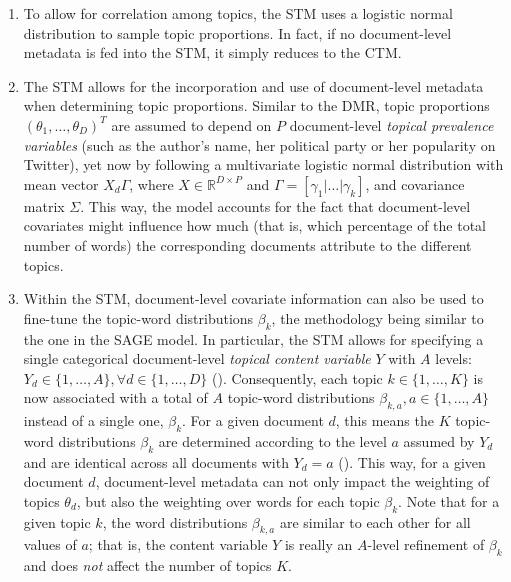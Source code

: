 \begin{enumerate}[label=(\roman*)]
\vspace{-0.25cm}
\item To allow for correlation among topics, the STM uses a logistic normal distribution to sample topic proportions. In fact, if no document-level metadata is fed into the STM, it simply reduces to the CTM.
\vspace{-0.25cm}
\item The STM allows for the incorporation and use of document-level metadata when determining topic proportions. Similar to the DMR, topic proportions $(\theta_1,\dots,\theta_D)^T$ are assumed to depend on $P$ document-level \textit{topical prevalence variables} (such as the author's name, her political party or her popularity on Twitter), yet now by following a multivariate logistic normal distribution with mean vector $X_d\Gamma$, where $X \in \mathbb{R}^{D \times P}$ and $\Gamma = [\gamma_1|\dots|\gamma_k]$, and covariance matrix $\Sigma$. This way, the model accounts for the fact that document-level covariates might influence how much (that is, which percentage of the total number of words) the corresponding documents attribute to the different topics.
\vspace{-0.25cm}
\item Within the STM, document-level covariate information can also be used to fine-tune the topic-word distributions $\beta_k$, the methodology being similar to the one in the SAGE model. In particular, the STM allows for specifying a single categorical document-level \textit{topical content variable} $Y$ with $A$ levels: $Y_d \in \{1,\dots,A\}, \forall d \in \{1,\dots,D\}$ (\citealp{stm}). Consequently, each topic $k \in \{1,\dots,K\}$ is now associated with a total of $A$ topic-word distributions $\beta_{k,a}, a \in \{1,\dots,A\}$ instead of a single one, $\beta_k$. For a given document $d$, this means the $K$ topic-word distributions $\beta_k$ are determined according to the level $a$ assumed by $Y_d$ and are identical across all documents with $Y_d = a$ (\citealp{roberts2016model}). This way, for a given document $d$, document-level metadata can not only impact the weighting of topics $\theta_d$, but also the weighting over words for each topic $\beta_k$. Note that for a given topic $k$, the word distributions $\beta_{k,a}$ are similar to each other for all values of $a$; that is, the content variable $Y$ is really an $A$-level refinement of $\beta_k$ and does \textit{not} affect the number of topics $K$.

\end{enumerate}

